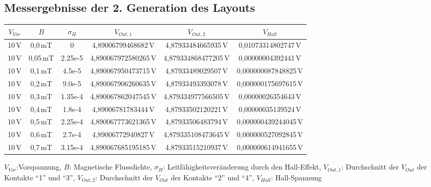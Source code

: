 \documentclass[12pt, a4paper]{article}
\renewcommand{\footnotesize}{\fontsize{10pt}{12pt}\selectfont}
\begin{document}
\subsection*{Messergebnisse der 2. Generation des Layouts}
\begin{center}
	\begin{tabular}{||c c c c c c||} 
		\hline
		$V_{Vor}$ & $B$ & $\sigma_H$ & $V_{Out,1}$ & $V_{Out,2}$ & $V_{Hall}$\\ [0.5ex] 
		\hline\hline
		10\,V & 0,0\,mT & 0       & 4,89006799468682\,V  & 4,87933484665935\,V   &  0,01073314802747\,V  \\ 
		\hline
		10\,V & 0,05\,mT& 2.25e-5 & 4,890067972580265\,V & 4,879334868477205\,V  &  0,00000004392441\,V  \\
		\hline
		10\,V & 0,1\,mT & 4.5e-5  & 4,890067950473715\,V & 4,87933489029507\,V   &  0,000000087848825\,V \\
		\hline
		10\,V & 0,2\,mT & 9.0e-5  & 4,890067906260635\,V & 4,87933493393078\,V   &  0,000000175697615\,V \\
		\hline
		10\,V & 0,3\,mT & 1.35e-4 & 4,890067862047545\,V & 4,879334977566505\,V  &  0,00000026354643\,V  \\  
		\hline
		10\,V & 0,4\,mT & 1.8e-4  & 4,89006781783444\,V  & 4,87933502120221\,V   &  0,00000035139524\,V  \\
		\hline
		10\,V & 0,5\,mT & 2.25e-4 & 4,890067773621365\,V & 4,87933506483794\,V   &  0,000000439244045\,V \\
		\hline
		10\,V & 0,6\,mT & 2.7e-4  & 4,89006772940827\,V  & 4,879335108473645\,V  &  0,000000527092845\,V \\
		\hline
		10\,V & 0,7\,mT & 3.15e-4 & 4,890067685195185\,V & 4,87933515210937\,V   &  0,000000614941655\,V \\ [1ex] 
		\hline
	\end{tabular}
\end{center}
\vspace{-0.8em}
\begin{center}
	\footnotesize
	$V_{Vor}$:Vorspannung, $B$: Magnetische Flussdichte, $\sigma_H$: Leitfähigkeitsveränderung durch den Hall-Effekt, $V_{Out,1}$: Durchschnitt der $V_{Out}$ der Kontakte ``1'' und ``3'', $V_{Out,2}$: Durchschnitt der $V_{Out}$ der Kontakte ``2'' und ``4'', $V_{Hall}$: Hall-Spannung
\end{center}\pagebreak
\end{document}
